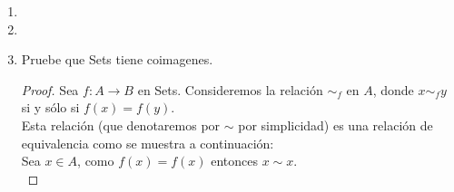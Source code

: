 \documentclass{article}
\begin{document}
\begin{enumerate}[label=\textbf{Ej \arabic*.}]
\begin{proof}
Así como $\alpha\mu_i=\beta\mu_i\,\,\forall i\in I$, entonces para cada $i\in I$ $\exists ! \mu_i':A_i\to K$ tal que $\eta\mu_i'=\mu_i$, es decir, se tiene que 
para cada $i\in I$ el siguiente diagrama conmuta:

\centerline{
}
entonces, $\eta f_i=\mu_i$.Con esto en mente, tenemos el siguiente diagrama para cada $i\in I$:\\


Entonces por la propiedad $(U_2)$ de la unión, existe $f:\displaystyle\bigcup_{i\in I}A_i\longrightarrow K$ tal que $\eta f=\mu$. Así 
\[\alpha\mu=\alpha\eta f=\beta \eta f=\beta\mu.\]

En el caso en que $I = \emptyset$, $\eta:K\to A$ el ecualizador de $(\alpha,\beta)$ cumple que $\forall i \in I\quad \mu_i\leq \eta$ (por 
vacuidad), entonces por la observación 1.3.4(2) $\mu\leq \eta$, es decir, existe $\gamma:\displaystyle\bigcup_{i\in I}A_i\longrightarrow K$ tal que 
$\mu=\eta \gamma$ así 
\[\alpha\mu=\alpha\eta\gamma=\beta \eta\gamma=\beta\mu.\]

\end{proof}




\item 

\item

\item Pruebe que Sets tiene coimagenes.

\begin{proof}
Sea $f:A\to B$ en Sets. Consideremos la relación $\sim_f$ en $A$, donde $x\sim_f y$ si y sólo si $f(x)=f(y)$.\\

Esta relación (que denotaremos por $\sim$ por simplicidad) es una relación de equivalencia como se muestra a continuación:\\

\quad Sea $x\in A$, como $f(x)=f(x)$ entonces $x\sim x$.\\


\end{proof}
\end{enumerate}
\end{document}
